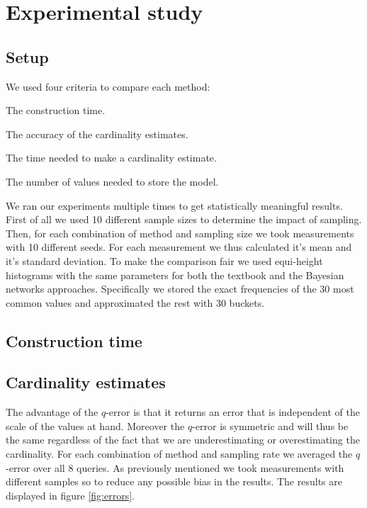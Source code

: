 \documentclass[runningheads]{llncs}
\begin{document}
\section{Experimental study}

\subsection{Setup}


We used four criteria to compare each method: 
\begin{enumerate*}[label=(\arabic*)]
    \item The construction time.
    \item The accuracy of the cardinality estimates.
    \item The time needed to make a cardinality estimate.
    \item The number of values needed to store the model.
\end{enumerate*}
We ran our experiments multiple times to get statistically meaningful results. First of all we used 10 different sample sizes to determine the impact of sampling. Then, for each combination of method and sampling size we took measurements with 10 different seeds. For each measurement we thus calculated it's mean and it's standard deviation. To make the comparison fair we used equi-height histograms with the same parameters for both the textbook and the Bayesian networks approaches. Specifically we stored the exact frequencies of the 30 most common values and approximated the rest with 30 buckets.

\subsection{Construction time}



\subsection{Cardinality estimates}


The advantage of the $q$-error is that it returns an error that is independent of the scale of the values at hand. Moreover the $q$-error is symmetric and will thus be the same regardless of the fact that we are underestimating or overestimating the cardinality. For each combination of method and sampling rate we averaged the $q$-error over all 8 queries. As previously mentioned we took measurements with different samples so to reduce any possible bias in the results. The results are displayed in figure \ref{fig:errors}.
\end{document}
